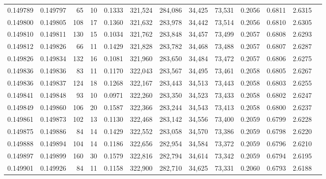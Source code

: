 \begin{tabular}{rrrrrrrrrrrrr}
0.149789 & 0.149797 &    65 &  10 &                                     0.1333 & 321,524 & 284,086 &  34,425 &  73,531 & 0.2056 & 0.6811 & 2.6315 \\
0.149800 & 0.149805 &   108 &  17 &                                     0.1360 & 321,632 & 283,978 &  34,442 &  73,514 & 0.2056 & 0.6810 & 2.6305 \\
0.149810 & 0.149811 &   130 &  15 &                                     0.1034 & 321,762 & 283,848 &  34,457 &  73,499 & 0.2057 & 0.6808 & 2.6293 \\
0.149812 & 0.149826 &    66 &  11 &                                     0.1429 & 321,828 & 283,782 &  34,468 &  73,488 & 0.2057 & 0.6807 & 2.6287 \\
0.149826 & 0.149834 &   132 &  16 &                                     0.1081 & 321,960 & 283,650 &  34,484 &  73,472 & 0.2057 & 0.6806 & 2.6275 \\
0.149836 & 0.149836 &    83 &  11 &                                     0.1170 & 322,043 & 283,567 &  34,495 &  73,461 & 0.2058 & 0.6805 & 2.6267 \\
0.149836 & 0.149837 &   124 &  18 &                                     0.1268 & 322,167 & 283,443 &  34,513 &  73,443 & 0.2058 & 0.6803 & 2.6255 \\
0.149841 & 0.149848 &    93 &  10 &                                     0.0971 & 322,260 & 283,350 &  34,523 &  73,433 & 0.2058 & 0.6802 & 2.6247 \\
0.149849 & 0.149860 &   106 &  20 &                                     0.1587 & 322,366 & 283,244 &  34,543 &  73,413 & 0.2058 & 0.6800 & 2.6237 \\
0.149861 & 0.149873 &   102 &  13 &                                     0.1130 & 322,468 & 283,142 &  34,556 &  73,400 & 0.2059 & 0.6799 & 2.6228 \\
0.149875 & 0.149886 &    84 &  14 &                                     0.1429 & 322,552 & 283,058 &  34,570 &  73,386 & 0.2059 & 0.6798 & 2.6220 \\
0.149888 & 0.149894 &   104 &  14 &                                     0.1186 & 322,656 & 282,954 &  34,584 &  73,372 & 0.2059 & 0.6796 & 2.6210 \\
0.149897 & 0.149899 &   160 &  30 &                                     0.1579 & 322,816 & 282,794 &  34,614 &  73,342 & 0.2059 & 0.6794 & 2.6195 \\
0.149901 & 0.149926 &    84 &  11 &                                     0.1158 & 322,900 & 282,710 &  34,625 &  73,331 & 0.2060 & 0.6793 & 2.6188 \\

\end{tabular}
